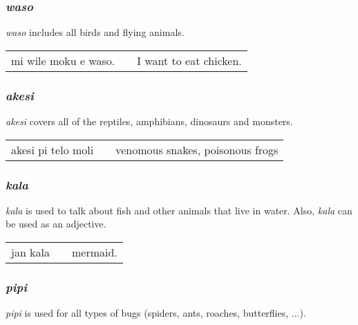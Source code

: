 \subsubsection*{\textit{waso}}
%
\textit{waso} includes all birds and flying animals. 

\begin{supertabular}{p{5,5cm}|ll}
mi wile moku e waso. && I want to eat chicken. \\
\end{supertabular} 
%
%
\subsubsection*{\textit{akesi}}
%
\textit{akesi} covers all of the reptiles, amphibians, dinosaurs and monsters.

\begin{supertabular}{p{5,5cm}|ll}
akesi pi telo moli && venomous snakes, poisonous frogs \\
\end{supertabular} 
%
\subsubsection*{\textit{kala}}
%
\textit{kala} is used to talk about fish and other animals that live in water. 
Also, \textit{kala} can be used as an adjective. 

\begin{supertabular}{p{5,5cm}|ll}
jan kala && mermaid. \\
\end{supertabular} 
%
\subsubsection*{\textit{pipi}}
%
\textit{pipi} is used for all types of bugs (spiders, ants, roaches, butterflies, ...). 
%
\newpage
{}
